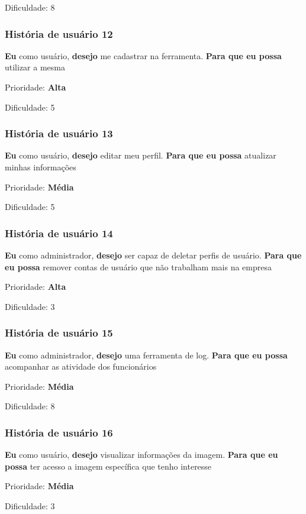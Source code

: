     Dificuldade: 8

  \subsubsection{História de usuário 12}
    \textbf{Eu} como usuário, \textbf{desejo} me cadastrar na ferramenta. \textbf{Para que eu possa} utilizar a mesma

    Prioridade: \textbf{Alta}

    Dificuldade: 5

  \subsubsection{História de usuário 13}
    \textbf{Eu} como usuário, \textbf{desejo} editar meu perfil. \textbf{Para que eu possa} atualizar minhas informações

    Prioridade: \textbf{Média}

    Dificuldade: 5

  \subsubsection{História de usuário 14}
    \textbf{Eu} como administrador, \textbf{desejo} ser capaz de deletar perfis de usuário. \textbf{Para que eu possa} remover contas de usuário que não trabalham mais na empresa

    Prioridade: \textbf{Alta}

    Dificuldade: 3

  \subsubsection{História de usuário 15}
    \textbf{Eu} como administrador, \textbf{desejo} uma ferramenta de log. \textbf{Para que eu possa} acompanhar as atividade dos funcionários

    Prioridade: \textbf{Média}

    Dificuldade: 8

  \subsubsection{História de usuário 16}
    \textbf{Eu} como usuário, \textbf{desejo} visualizar informações da imagem. \textbf{Para que eu possa} ter acesso a imagem específica que tenho interesse

    Prioridade: \textbf{Média}

    Dificuldade: 3

